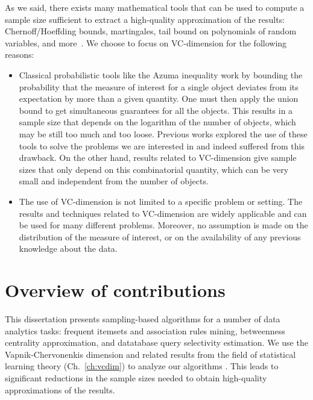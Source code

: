 As we said, there exists many mathematical tools that can be used to compute a
sample size sufficient to extract a high-quality approximation of the results:
Chernoff/Hoeffding bounds, martingales, tail bound
on polynomials of random variables, and
more~\citep{MitzenmacherU05,AlonS08,DubhashiP09}. We choose to focus on
VC-dimension for the following reasons:
\begin{itemize}
  \item Classical probabilistic tools like the Azuma inequality work by bounding
    the probability that the measure of interest for a single object deviates
    from its expectation by more than a given quantity. One must then apply the
    union bound to get simultaneous guarantees for all the objects. This results
    in a sample size that depends on the logarithm of the number of objects,
    which may be still too much and too loose. Previous works explored the use
    of these tools to solve the problems we are interested in and indeed
    suffered from this drawback. On the other hand, results related to
    VC-dimension give sample sizes that only depend on this combinatorial
    quantity, which can be very small and independent from the number of
    objects.
  \item The use of VC-dimension is not limited to a specific problem or setting.
    The results and techniques related to VC-dimension are widely applicable and
    can be used for many different problems. Moreover, no assumption is made on
    the distribution of the measure of interest, or on the availability of any
    previous knowledge about the data.
\end{itemize}

\section{Overview of contributions}
This dissertation presents sampling-based algorithms for a number of data
analytics tasks: frequent itemsets and association rules mining, betweenness
centrality approximation, and datatabase query selectivity estimation. We use
the Vapnik-Chervonenkis dimension and related results from the field of
statistical learning theory (Ch.~\ref{ch:vcdim}) to analyze our algorithms .
This leads to significant reductions in the sample sizes needed to obtain
high-quality approximations of the results. 

